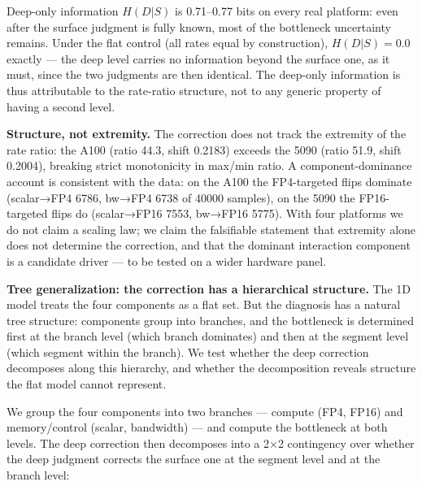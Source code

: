 \documentclass[11pt]{article}
\begin{document}
{{{Deep-only information \(H(D|S)\) is 0.71--0.77 bits on every real platform: even after the surface judgment is fully known, most of the bottleneck uncertainty remains. Under the flat control (all rates equal by construction), \(H(D|S) = 0.0\) exactly --- the deep level carries no information beyond the surface one, as it must, since the two judgments are then identical. The deep-only information is thus attributable to the rate-ratio structure, not to any generic property of having a second level.

\textbf{Structure, not extremity.} The correction does not track the extremity of the rate ratio: the A100 (ratio 44.3, shift 0.2183) exceeds the 5090 (ratio 51.9, shift 0.2004), breaking strict monotonicity in max/min ratio. A component-dominance account is consistent with the data: on the A100 the FP4-targeted flips dominate (scalar→FP4 6786, bw→FP4 6738 of 40000 samples), on the 5090 the FP16-targeted flips do (scalar→FP16 7553, bw→FP16 5775). With four platforms we do not claim a scaling law; we claim the falsifiable statement that extremity alone does not determine the correction, and that the dominant interaction component is a candidate driver --- to be tested on a wider hardware panel.

\textbf{Tree generalization: the correction has a hierarchical structure.} The 1D model treats the four components as a flat set. But the diagnosis has a natural tree structure: components group into branches, and the bottleneck is determined first at the branch level (which branch dominates) and then at the segment level (which segment within the branch). We test whether the deep correction decomposes along this hierarchy, and whether the decomposition reveals structure the flat model cannot represent.

We group the four components into two branches --- compute (FP4, FP16) and memory/control (scalar, bandwidth) --- and compute the bottleneck at both levels. The deep correction then decomposes into a 2×2 contingency over whether the deep judgment corrects the surface one at the segment level and at the branch level:

}}}
\end{document}
